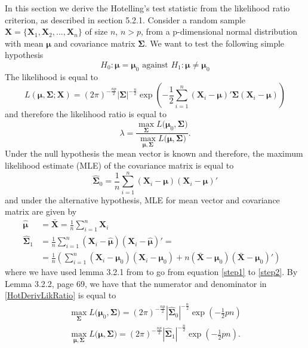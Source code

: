 In this section we derive the Hotelling's test statistic from the likelihood ratio criterion, as described in \cite{MultStatAnalysis} section 5.2.1. Consider a random sample $\mathbf{X}=\{\mathbf{X}_1, \mathbf{X}_2,...,\mathbf{X}_n\}$ of size $n$, $n>p$, from a p-dimensional normal distribution with mean $\boldsymbol{\mu}$ and covariance matrix $\boldsymbol{\Sigma}$. We want to test the following simple hypothesis
$$
H_0: \boldsymbol{\mu}=\boldsymbol{\mu}_0 \text{  against  } H_1: \boldsymbol{\mu}\neq\boldsymbol{\mu}_0
$$
The likelihood is equal to
$$
L(\boldsymbol{\mu}, \boldsymbol{\Sigma}; \mathbf{X}) = (2\pi)^{-\frac{np}{2}} |\boldsymbol{\Sigma}|^{-\frac{n}{2}} \exp\left(-\frac{1}{2}\sum_{i=1}^n (\mathbf{X}_i-\boldsymbol{\mu})'\boldsymbol{\Sigma}(\mathbf{X}_i-\boldsymbol{\mu})\right)
$$
and therefore the likelihood ratio is equal to
\begin{equation}\label{HotDerivLikRatio}
\lambda = \frac{\max_{\boldsymbol{\Sigma}} L(\boldsymbol{\mu}_0,\boldsymbol{\Sigma)}}{\max_{\boldsymbol{\mu},\boldsymbol{\Sigma}} L(\boldsymbol{\mu},\boldsymbol{\Sigma)}}.
\end{equation} 
Under the null hypothesis the mean vector is known and therefore, the maximum likelihood estimate (MLE) of the covariance matrix is equal to 
$$
\widehat{\boldsymbol{\Sigma}}_0=\frac{1}{n} \sum_{i=1}^{n}(\mathbf{X}_i-\boldsymbol{\mu})(\mathbf{X}_i-\boldsymbol{\mu})'
$$
and under the alternative hypothesis, MLE for mean vector and covariance matrix are given by
\begin{align}
\hat{\boldsymbol{\mu}}&=\bar{\mathbf{X}}=\frac{1}{n} \sum_{i=1}^{n} \mathbf{X}_i&\nonumber \\
\widehat{\boldsymbol{\Sigma}}_1&=\frac{1}{n}\sum_{i=1}^{n}(\mathbf{X}_i-\hat{\boldsymbol{\mu}})(\mathbf{X}_i-\hat{\boldsymbol{\mu}})'= & \label{step1} \\
&=\frac{1}{n}\left(\sum_{i=1}^{n}(\mathbf{X}_i-\boldsymbol{\mu}_0)(\mathbf{X}_i-\boldsymbol{\mu}_0)+n(\bar{\mathbf{X}}-\boldsymbol{\mu}_0)(\bar{\mathbf{X}}-\boldsymbol{\mu}_0)'\right) & \label{step2}
\end{align}
where we have used lemma 3.2.1 from \cite{MultStatAnalysis} to go from equation \eqref{step1} to \eqref{step2}. 
By Lemma 3.2.2, \cite{MultStatAnalysis} page 69, we have that the numerator and denominator in \eqref{HotDerivLikRatio} is equal to
\begin{align*} 
&\max_{\boldsymbol{\Sigma}} L(\boldsymbol{\mu}_0,\boldsymbol{\Sigma)}=(2\pi)^{-\frac{np}{2}} |\widehat{\boldsymbol{\Sigma}}_0|^{-\frac{n}{2}} \exp\left(-\frac{1}{2}pn\right)& \\ 
&\max_{\boldsymbol{\mu},\boldsymbol{\Sigma}} L(\boldsymbol{\mu},\boldsymbol{\Sigma)}=(2\pi)^{-\frac{np}{2}} |\widehat{\boldsymbol{\Sigma}}_1|^{-\frac{n}{2}} \exp\left(-\frac{1}{2}pn\right). & 
\end{align*}
